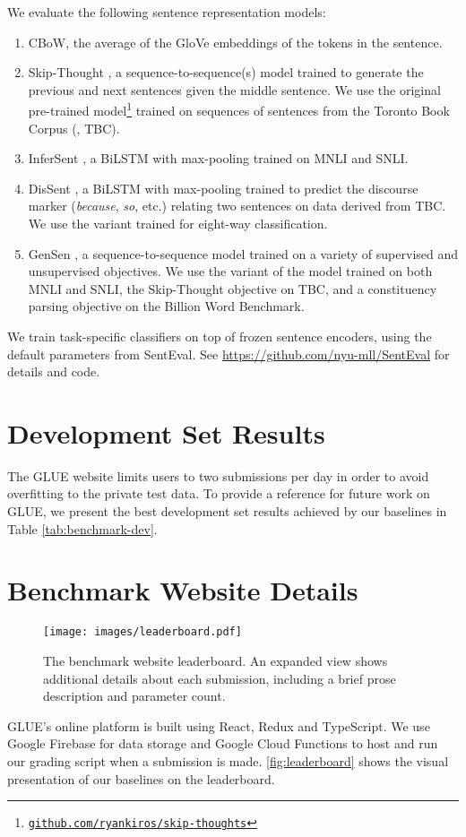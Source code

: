 \documentclass{article} \usepackage{iclr2019_conference,times}
\begin{document}
We evaluate the following sentence representation models:
\begin{enumerate}
\item CBoW, the average of the GloVe embeddings of the tokens in the sentence.
\item Skip-Thought \citep{kiros2015skip}, a sequence-to-sequence(s) model trained to generate the previous and next sentences given the middle sentence. 
We use the original pre-trained model\footnote{\href{https://github.com/ryankiros/skip-thoughts}{\tt github.com/\allowbreak ryankiros/\allowbreak skip-thoughts}} trained on sequences of sentences from the Toronto Book Corpus (\citealt{zhu2015aligning}, TBC). 
\item InferSent \citep{DBLP:conf/emnlp/ConneauKSBB17}, a 
BiLSTM with max-pooling trained on MNLI and SNLI.
\item DisSent \citep{nie2017dissent}, a BiLSTM with max-pooling trained to predict the discourse marker (\textit{because}, \textit{so}, etc.) relating two sentences on data derived from TBC. 
We use the variant trained for eight-way classification.
\item GenSen \citep{subramanian2018large}, a sequence-to-sequence model trained on a variety of supervised and unsupervised objectives. 
We use the variant of the model trained on both MNLI and SNLI, the Skip-Thought objective on TBC, and a constituency parsing objective on the Billion Word Benchmark.
\end{enumerate}

We train task-specific classifiers on top of frozen sentence encoders, using the default parameters from SentEval. See \href{https://github.com/nyu-mll/SentEval}{https://github.com/nyu-mll/SentEval} for details and code.

\section{Development Set Results}\label{sec:apdx_dev}

The GLUE website limits users to two submissions per day in order to avoid overfitting to the private test data. To provide a reference for future work on GLUE, we present the best development set results achieved by our baselines in Table \ref{tab:benchmark-dev}.

\section{Benchmark Website Details}\label{sec:apdx_website}
\begin{figure*}[t]
\centering
\texttt{[image: images/leaderboard.pdf]}
\caption{The benchmark website leaderboard. An expanded view shows additional details about each submission, including a brief prose description and parameter count.}
\label{fig:leaderboard}
\end{figure*}
GLUE's online platform is built using React, Redux and TypeScript. We use Google Firebase for data storage and Google Cloud Functions to host and run our grading script when a submission is made. \autoref{fig:leaderboard} shows the visual presentation of our baselines on the leaderboard. 
\end{document}
